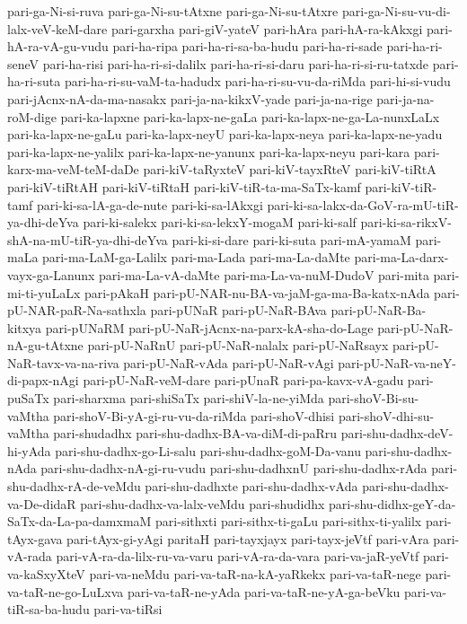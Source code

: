 {pari-ga-Ni-si-ruva
pari-ga-Ni-su-tAtxne
pari-ga-Ni-su-tAtxre
pari-ga-Ni-su-vu-di-lalx-veV-keM-dare
pari-garxha
pari-giV-yateV
pari-hAra
pari-hA-ra-kAkxgi
pari-hA-ra-vA-gu-vudu
pari-ha-ripa
pari-ha-ri-sa-ba-hudu
pari-ha-ri-sade
pari-ha-ri-seneV
pari-ha-risi
pari-ha-ri-si-dalilx
pari-ha-ri-si-daru
pari-ha-ri-si-ru-tatxde
pari-ha-ri-suta
pari-ha-ri-su-vaM-ta-hadudx
pari-ha-ri-su-vu-da-riMda
pari-hi-si-vudu
pari-jAcnx-nA-da-ma-nasakx
pari-ja-na-kikxV-yade
pari-ja-na-rige
pari-ja-na-roM-dige
pari-ka-lapxne
pari-ka-lapx-ne-gaLa
pari-ka-lapx-ne-ga-La-nunxLaLx
pari-ka-lapx-ne-gaLu
pari-ka-lapx-neyU
pari-ka-lapx-neya
pari-ka-lapx-ne-yadu
pari-ka-lapx-ne-yalilx
pari-ka-lapx-ne-yanunx
pari-ka-lapx-neyu
pari-kara
pari-karx-ma-veM-teM-daDe
pari-kiV-taRyxteV
pari-kiV-tayxRteV
pari-kiV-tiRtA
pari-kiV-tiRtAH
pari-kiV-tiRtaH
pari-kiV-tiR-ta-ma-SaTx-kamf
pari-kiV-tiR-tamf
pari-ki-sa-lA-ga-de-nute
pari-ki-sa-lAkxgi
pari-ki-sa-lakx-da-GoV-ra-mU-tiR-ya-dhi-deYva
pari-ki-salekx
pari-ki-sa-lekxY-mogaM
pari-ki-salf
pari-ki-sa-rikxV-shA-na-mU-tiR-ya-dhi-deYva
pari-ki-si-dare
pari-ki-suta
pari-mA-yamaM
pari-maLa
pari-ma-LaM-ga-Lalilx
pari-ma-Lada
pari-ma-La-daMte
pari-ma-La-darx-vayx-ga-Lanunx
pari-ma-La-vA-daMte
pari-ma-La-va-nuM-DudoV
pari-mita
pari-mi-ti-yuLaLx
pari-pAkaH
pari-pU-NAR-nu-BA-va-jaM-ga-ma-Ba-katx-nAda
pari-pU-NAR-paR-Na-sathxla
pari-pUNaR
pari-pU-NaR-BAva
pari-pU-NaR-Ba-kitxya
pari-pUNaRM
pari-pU-NaR-jAcnx-na-parx-kA-sha-do-Lage
pari-pU-NaR-nA-gu-tAtxne
pari-pU-NaRnU
pari-pU-NaR-nalalx
pari-pU-NaRsayx
pari-pU-NaR-tavx-va-na-riva
pari-pU-NaR-vAda
pari-pU-NaR-vAgi
pari-pU-NaR-va-neY-di-papx-nAgi
pari-pU-NaR-veM-dare
pari-pUnaR
pari-pa-kavx-vA-gadu
pari-puSaTx
pari-sharxma
pari-shiSaTx
pari-shiV-la-ne-yiMda
pari-shoV-Bi-su-vaMtha
pari-shoV-Bi-yA-gi-ru-vu-da-riMda
pari-shoV-dhisi
pari-shoV-dhi-su-vaMtha
pari-shudadhx
pari-shu-dadhx-BA-va-diM-di-paRru
pari-shu-dadhx-deV-hi-yAda
pari-shu-dadhx-go-Li-salu
pari-shu-dadhx-goM-Da-vanu
pari-shu-dadhx-nAda
pari-shu-dadhx-nA-gi-ru-vudu
pari-shu-dadhxnU
pari-shu-dadhx-rAda
pari-shu-dadhx-rA-de-veMdu
pari-shu-dadhxte
pari-shu-dadhx-vAda
pari-shu-dadhx-va-De-didaR
pari-shu-dadhx-va-lalx-veMdu
pari-shudidhx
pari-shu-didhx-geY-da-SaTx-da-La-pa-damxmaM
pari-sithxti
pari-sithx-ti-gaLu
pari-sithx-ti-yalilx
pari-tAyx-gava
pari-tAyx-gi-yAgi
paritaH
pari-tayxjayx
pari-tayx-jeVtf
pari-vAra
pari-vA-rada
pari-vA-ra-da-lilx-ru-va-varu
pari-vA-ra-da-vara
pari-va-jaR-yeVtf
pari-va-kaSxyXteV
pari-va-neMdu
pari-va-taR-na-kA-yaRkekx
pari-va-taR-nege
pari-va-taR-ne-go-LuLxva
pari-va-taR-ne-yAda
pari-va-taR-ne-yA-ga-beVku
pari-va-tiR-sa-ba-hudu
pari-va-tiRsi
}
